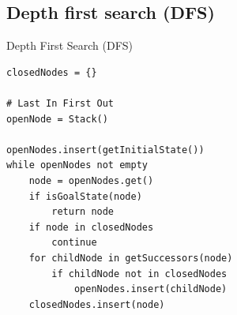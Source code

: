 \documentclass{beamer}
\begin{document}
\subsection{Depth first search (DFS)}

\begin{frame}[fragile]{Depth First Search (DFS)}
	\begin{lstlisting}
closedNodes = {}

# Last In First Out
openNode = Stack()

openNodes.insert(getInitialState())
while openNodes not empty 
	node = openNodes.get()
	if isGoalState(node)
		return node
	if node in closedNodes
		continue				
	for childNode in getSuccessors(node)
		if childNode not in closedNodes
			openNodes.insert(childNode)
	closedNodes.insert(node)
	\end{lstlisting}
\end{frame}
\end{document}
